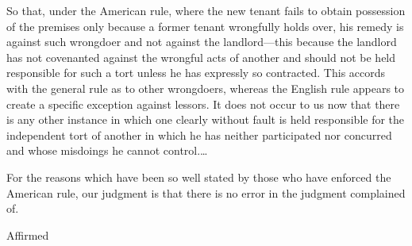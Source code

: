So that, under the American rule, where the new tenant fails to obtain
possession of the premises only because a former tenant wrongfully holds over,
his remedy is against such wrongdoer and not against the landlord---this
because the landlord has not covenanted against the wrongful acts of another
and should not be held responsible for such a tort unless he has expressly so
contracted. This accords with the general rule as to other wrongdoers, whereas
the English rule appears to create a specific exception against lessors. It
does not occur to us now that there is any other instance in which one clearly
without fault is held responsible for the independent tort of another in which
he has neither participated nor concurred and whose misdoings he cannot
control.\ldots

For the reasons which have been so well stated by those who have enforced the
American rule, our judgment is that there is no error in the judgment
complained of.

Affirmed


